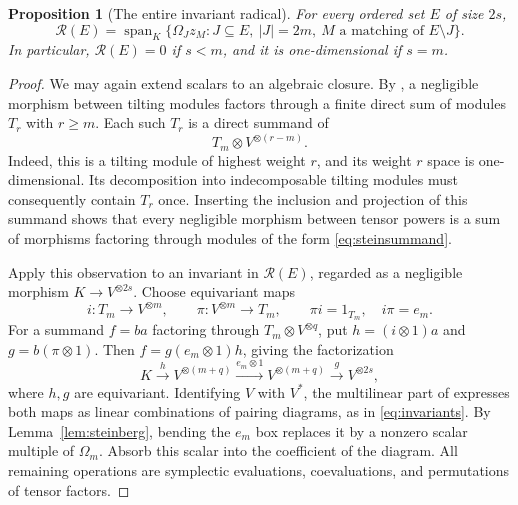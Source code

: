 \documentclass[11pt]{article}
\newtheorem{proposition}[theorem]{Proposition}
\theoremstyle{definition}
\theoremstyle{remark}
\numberwithin{equation}{section}
\newcommand{\kk}{K}
\newcommand{\set}[1]{\{#1\}}
\begin{document}
\begin{proposition}[The entire invariant radical]\label{prop:radgens}
For every ordered set $E$ of size $2s$,
\begin{equation}\label{eq:radspan}
 \mathcal R(E)=
 \operatorname{span}_\kk
 \set{\Omega_J z_M:
       J\subseteq E,\ |J|=2m,\ M\text{ a matching of }E\setminus J}.
\end{equation}
In particular, $\mathcal R(E)=0$ if $s<m$, and it is one-dimensional
if $s=m$.
\end{proposition}

\begin{proof}
We may again extend scalars to an algebraic closure. By
\cite[Lemma~2.6 and Corollary~2.7]{BFRSW}, a negligible morphism between
tilting modules factors through a finite direct sum of modules $T_r$
with $r\geq m$. Each such $T_r$ is a direct summand of
\begin{equation}\label{eq:steinsummand}
 T_m\otimes V^{\otimes(r-m)}.
\end{equation}
Indeed, this is a tilting module of highest weight $r$, and its weight
$r$ space is one-dimensional. Its decomposition into indecomposable
tilting modules must consequently contain $T_r$ once. Inserting the
inclusion and projection of this summand shows that every negligible
morphism between tensor powers is a sum of morphisms factoring through
modules of the form \eqref{eq:steinsummand}.

Apply this observation to an invariant in $\mathcal R(E)$, regarded as
a negligible morphism $\kk\to V^{\otimes 2s}$. Choose equivariant maps
\[
 i:T_m\longrightarrow V^{\otimes m},\qquad
 \pi:V^{\otimes m}\longrightarrow T_m,\qquad
 \pi i=1_{T_m},\quad i\pi=e_m.
\]
For a summand $f=ba$ factoring through $T_m\otimes V^{\otimes q}$,
put $h=(i\otimes1)a$ and $g=b(\pi\otimes1)$. Then
$f=g(e_m\otimes1)h$, giving the factorization
\begin{equation}\label{eq:factorization}
 \kk\xrightarrow{h}V^{\otimes(m+q)}
 \xrightarrow{e_m\otimes 1}V^{\otimes(m+q)}
 \xrightarrow{g}V^{\otimes 2s},
\end{equation}
where $h,g$ are equivariant. Identifying $V$ with $V^*$, the multilinear
part of \cite[Theorem~17]{Hashimoto} expresses both maps as linear
combinations of pairing diagrams, as in \eqref{eq:invariants}.
By Lemma~\ref{lem:steinberg}, bending the $e_m$ box replaces it by a
nonzero scalar multiple of $\Omega_m$. Absorb this scalar into the
coefficient of the diagram. All remaining operations are symplectic
evaluations, coevaluations, and permutations of tensor factors.


\end{proof}
\end{document}
